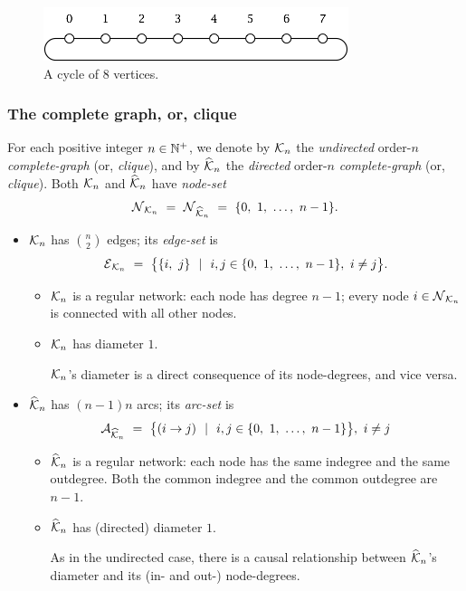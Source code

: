 \begin{figure}[hbt]
\begin{center}
       \includegraphics[scale=0.7]{FiguresGraph/cycle}
       \caption{A cycle of $8$ vertices.}
  \label{fig:cycle}
\end{center}
\end{figure}

\subsubsection{The complete graph, or, clique}

For each positive integer $n \in \mathbb{N}^+$, we denote by $\mbox{$\cal K$}_n$ the {\em
  undirected} order-$n$ {\it complete-graph} (or, {\it clique}),
  and by $\widehat{\mbox{$\cal K$}}_n$ the {\em
  directed} order-$n$ {\it complete-graph} (or, {\it clique}).  Both
$\mbox{$\cal K$}_n$ and $\widehat{\mbox{$\cal K$}}_n$ have {\it node-set}
\[ \mbox{$\cal N$}_{{\cal K}_n} \ = \ \mbox{$\cal N$}_{\widehat{{\cal K}}_n}
\ = \ \{ 0, \ 1, \ \ldots, \ n-1\}. \]
\begin{itemize}
\item
$\mbox{$\cal K$}_n$ has $\displaystyle {n \choose 2}$ edges; its {\it edge-set} is
\[ \mbox{$\cal E$}_{{\cal K}_n} \ = \
\big\{ \{i, \ j\} \ \ | \ \ i,j \in \{0, \ 1, \ \ldots, \ n-1\}, \ i
\neq j \big\}.
\]
  \begin{itemize}
  \item {} 
$\mbox{$\cal K$}_n$ is a regular network: each node has degree $n-1$; every node $i
\in \mbox{$\cal N$}_{\mbox{{\scriptsize $\cal K$}}_n}$ is connected with all other nodes.

   \item {}
$\mbox{$\cal K$}_n$ has diameter $1$.

$\mbox{$\cal K$}_n$'s diameter is a direct consequence of its node-degrees, and vice versa.
  \end{itemize}

\item
$\widehat{\mbox{$\cal K$}}_n$ has $(n-1)n$ arcs; its {\it arc-set} is
\[ \a_{\widehat{{\cal K}}_n} \ = \ 
\big\{ (i \rightarrow j) \ \ | \ \ i,j \in \{0, \ 1, \ \ldots, \ n-1\}
\big\}, \ i \neq j
\]
  \begin{itemize}
  \item
$\widehat{\mbox{$\cal K$}}_n$ is a regular network: each node has the same indegree
    and the same outdegree.  Both the common indegree and the common
    outdegree are $n-1$.
  \item
$\widehat{\mbox{$\cal K$}}_n$ has (directed) diameter $1$.

As in the undirected case, there is a causal relationship between
$\widehat{\mbox{$\cal K$}}_n$'s diameter and its (in- and out-) node-degrees.
  \end{itemize}
\end{itemize}

